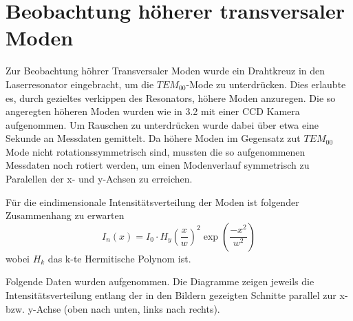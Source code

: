 \documentclass[bigchapter,colorback,accentcolor=tud4b,linedtoc,11pt]{tudreport}
\numberwithin{equation}{subsection}
\begin{document}
\section{Beobachtung höherer transversaler Moden}
Zur Beobachtung höhrer Transversaler Moden wurde ein Drahtkreuz in den Laserresonator eingebracht, um die $TEM_{00}$-Mode zu unterdrücken. Dies erlaubte es, durch gezieltes verkippen des Resonators, höhere Moden anzuregen. Die so angeregten höheren Moden wurden wie in 3.2 mit einer CCD Kamera aufgenommen. Um Rauschen zu unterdrücken wurde dabei über etwa eine Sekunde an Messdaten gemittelt. Da höhere Moden im Gegensatz zut $TEM_{00}$ Mode nicht rotationssymmetrisch sind, mussten die so aufgenommenen Messdaten noch rotiert werden, um einen Modenverlauf symmetrisch zu Paralellen der x- und y-Achsen zu erreichen.

Für die eindimensionale Intensitätsverteilung der Moden ist folgender Zusammenhang zu erwarten
$$I_{n}(x) = I_0 \cdot  H_y \left( \frac{x}{w} \right)^2 \exp \left( \frac{-x^2}{w^2} \right)  $$
\cite{TransModeIntensity}
wobei $H_k$ das k-te Hermitische Polynom ist.

Folgende Daten wurden aufgenommen. Die Diagramme zeigen jeweils die Intensitätsverteilung entlang der in den Bildern gezeigten Schnitte parallel zur x- bzw. y-Achse (oben nach unten, links nach rechts).
\end{document}
